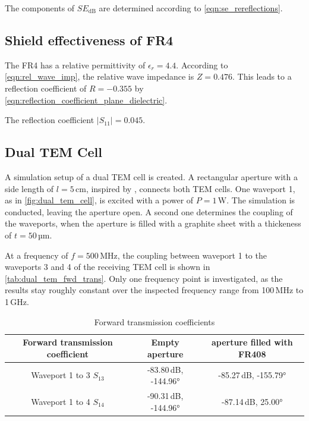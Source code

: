 
The components of $SE_\mathrm{dB}$ are determined according to \autoref{eqn:se_rereflections}. 

\subsection{Shield effectiveness of FR4}

The FR4 has a relative permittivity of $\epsilon_r=4.4$. According to \autoref{eqn:rel_wave_imp}, the relative wave impedance is $Z=0.476$. This leads to a reflection coefficient of $R=-0.355$ by \autoref{eqn:reflection_coefficient_plane_dielectric}.


The reflection coefficient $|S_{11}|=0.045$.

\subsection{Dual TEM Cell}

A simulation setup of a dual TEM cell is created. A rectangular aperture with a side length of $l=5\,\mathrm{cm}$, inspired by \cite{Wilson_1981}, connects both TEM cells. One waveport 1, as in \autoref{fig:dual_tem_cell}, is excited with a power of $P=1\,\mathrm{W}$. The simulation is conducted, leaving the aperture open. A second one determines the coupling of the waveports, when the aperture is filled with a graphite sheet with a thickeness of $t=50$\,µm.

At a frequency of $f=500\,\mathrm{MHz}$, the coupling between waveport 1 to the waveports 3 and 4 of the receiving TEM cell is shown in \autoref{tab:dual_tem_fwd_trans}. Only one frequency point is investigated, as the results stay roughly constant over the inspected frequency range from 100\,MHz to 1\,GHz. 


\begin{table}
    \centering
    \begin{tabular}{|c|c|c|}
        \hline
        Forward transmission coefficient & Empty aperture & aperture filled with FR408\\\hline\hline
        Waveport 1 to 3 $S_{13}$ & -83.80\,dB, -144.96° & -85.27\,dB, -155.79°\\\hline
        Waveport 1 to 4 $S_{14}$ & -90.31\,dB, -144.96° & -87.14\,dB, 25.00°\\\hline
    \end{tabular}
    \caption{Forward transmission coefficients}
    \label{tab:dual_tem_fwd_trans}
\end{table}

